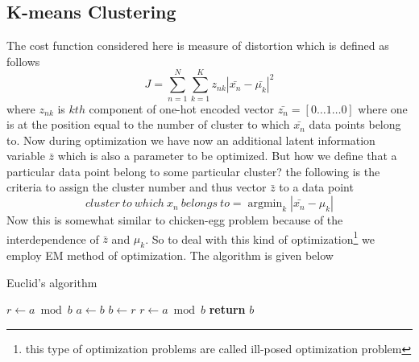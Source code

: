 \documentclass[a4paper]{article}
\DeclareMathOperator*{\argmin}{argmin}
\begin{document}
\subsection{K-means Clustering}
The cost function considered here is measure of distortion which is defined as follows
\begin{equation}
J=\sum_{n=1}^{N}\sum_{k=1}^{K}z_{nk}\left|\bar{x_{n}}-\bar{\mu_{k}}\right|^2
\end{equation}where $z_{nk}$ is $kth$ component of one-hot encoded vector $\bar{z_{n}}=\left[0\dots1\dots0\right]$ where one is at the position equal to the number of cluster to which $\bar{x_{n}}$ data points belong to. Now during optimization we have now an additional latent information variable $\bar{z}$ which is also a parameter to be optimized. But how we define that a particular data point belong to some particular cluster? the following is the criteria to assign the cluster number and thus vector $\bar{z}$ to a data point
\[
cluster\ to\ which\ x_{n}\ belongs\ to = \argmin_{k}\left|\bar{x_{n}}-\mu_{k}\right|
\]Now this is somewhat similar to chicken-egg problem because of the interdependence of $\bar{z}$ and $\mu_{k}$. So to deal with this kind of optimization\footnote{this type of optimization problems are called ill-posed optimization problem} we employ EM method of optimization. The algorithm is given below
\begin{algorithm}
\caption{Euclid’s algorithm}\label{alg:euclid}
\begin{algorithmic}[1]
\State $r\gets a\bmod b$
\State $a\gets b$
\State $b\gets r$
\State $r\gets a\bmod b$
\EndWhile\label{euclidendwhile}
\State \textbf{return} $b$
\EndProcedure
\end{algorithmic}
\end{algorithm}
\end{document}
